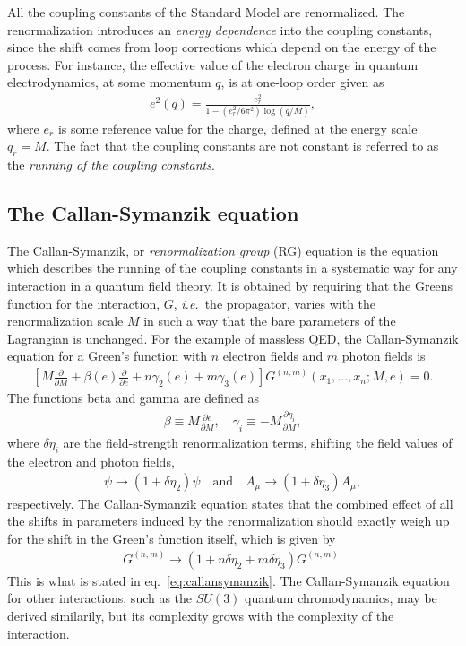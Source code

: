 \documentclass[twoside,english]{uiofysmaster}
\begin{document}
All the coupling constants of the Standard Model are renormalized. The renormalization introduces an {\it energy dependence} into the coupling constants, since the shift comes from loop corrections which depend on the energy of the process. For instance, the effective value of the electron charge in quantum electrodynamics, at some momentum $q$, is at one-loop order given as
\begin{align}
	e^2(q) = \frac{e_r^2}{1 - (e_r^2/6\pi^2)\log(q/M)},\label{eq:electron_charge_running}
\end{align}
where $e_r$ is some reference value for the charge, defined at the energy scale $q_r = M$. The fact that the coupling constants are not constant is referred to as the {\it running of the coupling constants}.

\subsection{The Callan-Symanzik equation}
The Callan-Symanzik, or {\it renormalization group} (RG) equation is the equation which describes the running of the coupling constants in a systematic way for any interaction in a quantum field theory. It is obtained by requiring that the Greens function for the interaction, $G$, {\it i.e.}\ the propagator, varies with the renormalization scale $M$ in such a way that the bare parameters of the Lagrangian is unchanged. For the example of massless QED, the Callan-Symanzik equation for a Green's function with $n$ electron fields and $m$ photon fields is \cite[p.\ 411]{Peskin-Schroeder}
\begin{align}
	\left[ M \frac{\partial}{\partial M} + \beta(e) \frac{\partial}{\partial e} + n\gamma_2(e) + m\gamma_3(e)\right] G^{(n,m)}(x_1, ..., x_n; M,e) = 0.\label{eq:callansymanzik}
\end{align}
The functions beta and gamma are defined as
\begin{align}
	\beta \equiv M\frac{\partial e}{\partial M} , \quad \gamma_i \equiv - M\frac{\partial \eta_i}{\partial M},
\end{align}
where $\delta\eta_i$ are the field-strength renormalization terms, shifting the field values of the electron and photon fields,
\begin{align}
	\psi \to (1 + \delta \eta_2) \psi \quad \mathrm{and} \quad A_\mu \to (1 + \delta\eta_3) A_\mu,
\end{align}
respectively. The Callan-Symanzik equation states that the combined effect of all the shifts in parameters induced by the renormalization should exactly weigh up for the shift in the Green's function itself, which is given by
\begin{align}
	G^{(n,m)} \to (1 + n\delta\eta_2 + m\delta\eta_3)G^{(n,m)}.
\end{align}
This is what is stated in eq.\ \eqref{eq:callansymanzik}. The Callan-Symanzik equation for other interactions, such as the $SU(3)$ quantum chromodynamics, may be derived similarily, but its complexity grows with the complexity of the interaction.
\end{document}
